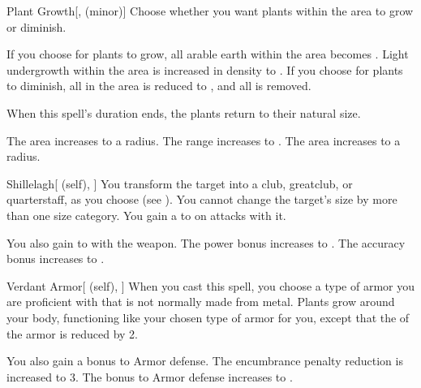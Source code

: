 \lowercase{\hypertarget{spell:Plant Growth}{}}\label{spell:Plant Growth}
\begin{freeability}[Rank 1]{\hypertarget{spell:Plant Growth}{Plant Growth}}[,  (minor)]
Choose whether you want plants within the area to grow or diminish.

If you choose for plants to grow, all arable earth within the area becomes .
Light undergrowth within the area is increased in density to .
If you choose for plants to diminish, all  in the area is reduced to , and all  is removed.

When this spell's duration ends, the plants return to their natural size.

\rankline
{} The area increases to a \arealarge radius.
 The range increases to \rnglong.
 The area increases to a \areahuge radius.
\end{freeability}
\vspace{0.25em}



\lowercase{\hypertarget{spell:Shillelagh}{}}\label{spell:Shillelagh}
\begin{attuneability}[Rank 1]{\hypertarget{spell:Shillelagh}{Shillelagh}}[ (self), ]
You transform the target into a club, greatclub, or quarterstaff, as you choose (see ).
You cannot change the target's size by more than one size category.
You gain a   to  on attacks with it.

\rankline
{} You also gain   to  with the weapon.
 The power bonus increases to .
 The accuracy bonus increases to .
\end{attuneability}
\vspace{0.25em}



\lowercase{\hypertarget{spell:Verdant Armor}{}}\label{spell:Verdant Armor}
\begin{attuneability}[Rank 1]{\hypertarget{spell:Verdant Armor}{Verdant Armor}}[ (self), ]
When you cast this spell, you choose a type of armor you are proficient with that is not normally made from metal.
Plants grow around your body, functioning like your chosen type of armor for you, except that the  of the armor is reduced by 2.

\rankline
{} You also gain a  bonus to Armor defense.
 The encumbrance penalty reduction is increased to 3.
 The bonus to Armor defense increases to .
\end{attuneability}
\vspace{0.25em}



